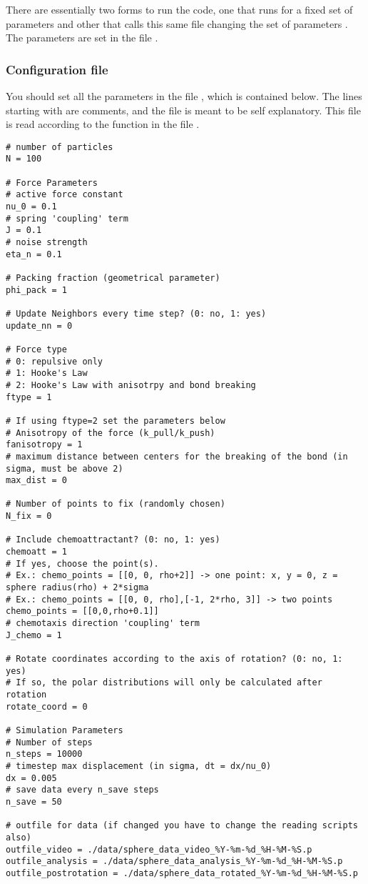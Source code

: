\documentclass[12pt]{article}
\begin{document}
There are essentially two forms to run the code, one that runs for a fixed set of parameters  and other that calls this same file changing the set of parameters . The parameters are set in the file .

\subsubsection{Configuration file}

You should set all the parameters in the file , which is contained below. The lines starting with  are comments, and the file is meant to be self explanatory. This file is read according to the function  in the file .

\begin{verbatim}
# number of particles
N = 100

# Force Parameters
# active force constant
nu_0 = 0.1
# spring 'coupling' term
J = 0.1
# noise strength
eta_n = 0.1

# Packing fraction (geometrical parameter)
phi_pack = 1

# Update Neighbors every time step? (0: no, 1: yes)
update_nn = 0

# Force type
# 0: repulsive only
# 1: Hooke's Law
# 2: Hooke's Law with anisotrpy and bond breaking
ftype = 1

# If using ftype=2 set the parameters below
# Anisotropy of the force (k_pull/k_push)
fanisotropy = 1
# maximum distance between centers for the breaking of the bond (in sigma, must be above 2)
max_dist = 0

# Number of points to fix (randomly chosen)
N_fix = 0

# Include chemoattractant? (0: no, 1: yes)
chemoatt = 1
# If yes, choose the point(s).
# Ex.: chemo_points = [[0, 0, rho+2]] -> one point: x, y = 0, z = sphere radius(rho) + 2*sigma
# Ex.: chemo_points = [[0, 0, rho],[-1, 2*rho, 3]] -> two points
chemo_points = [[0,0,rho+0.1]]
# chemotaxis direction 'coupling' term
J_chemo = 1

# Rotate coordinates according to the axis of rotation? (0: no, 1: yes)
# If so, the polar distributions will only be calculated after rotation 
rotate_coord = 0

# Simulation Parameters
# Number of steps
n_steps = 10000
# timestep max displacement (in sigma, dt = dx/nu_0)
dx = 0.005
# save data every n_save steps
n_save = 50

# outfile for data (if changed you have to change the reading scripts also)
outfile_video = ./data/sphere_data_video_%Y-%m-%d_%H-%M-%S.p
outfile_analysis = ./data/sphere_data_analysis_%Y-%m-%d_%H-%M-%S.p
outfile_postrotation = ./data/sphere_data_rotated_%Y-%m-%d_%H-%M-%S.p
\end{verbatim}
\end{document}
